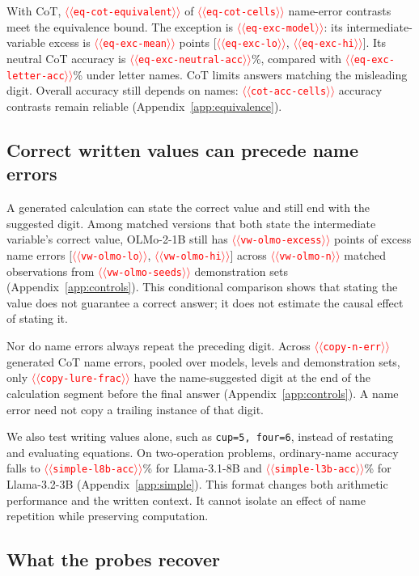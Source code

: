 \documentclass[11pt]{article}
\providecommand{\NUM}[1]{\textcolor{red}{$\langle\langle$\texttt{#1}$\rangle\rangle$}}
\begin{document}
With CoT, \NUM{eq-cot-equivalent} of \NUM{eq-cot-cells} name-error contrasts meet the equivalence
bound. The exception is \NUM{eq-exc-model}: its intermediate-variable excess is
\NUM{eq-exc-mean} points [\NUM{eq-exc-lo}, \NUM{eq-exc-hi}]. Its neutral CoT accuracy is
\NUM{eq-exc-neutral-acc}\%, compared with \NUM{eq-exc-letter-acc}\% under letter names.
CoT limits answers matching the misleading digit. Overall accuracy still depends on names:
\NUM{cot-acc-cells} accuracy contrasts remain reliable
(Appendix~\ref{app:equivalence}).





\subsection{Correct written values can precede name errors}
\label{sec:written-controls}

A generated calculation can state the correct value and still end with the suggested
digit. Among matched versions that both state the intermediate variable's correct value,
OLMo-2-1B still has \NUM{vw-olmo-excess} points of excess name errors
[\NUM{vw-olmo-lo}, \NUM{vw-olmo-hi}] across \NUM{vw-olmo-n} matched observations from
\NUM{vw-olmo-seeds} demonstration sets (Appendix~\ref{app:controls}). This conditional
comparison shows that stating the value does not guarantee a correct answer; it does
not estimate the causal effect of stating it.

Nor do name errors always repeat the preceding digit. Across \NUM{copy-n-err} generated
CoT name errors, pooled over models, levels and demonstration sets, only
\NUM{copy-lure-frac} have the name-suggested digit at the end of the calculation segment
before the final answer (Appendix~\ref{app:controls}). A name error need not copy a trailing
instance of that digit.

We also test writing values alone, such as \texttt{cup=5, four=6}, instead of restating
and evaluating equations. On two-operation problems, ordinary-name accuracy falls to
\NUM{simple-l8b-acc}\% for Llama-3.1-8B and \NUM{simple-l3b-acc}\% for Llama-3.2-3B
(Appendix~\ref{app:simple}). This format changes both arithmetic performance and the
written context. It cannot isolate an effect of name repetition while preserving computation.

\subsection{What the probes recover}
\end{document}
